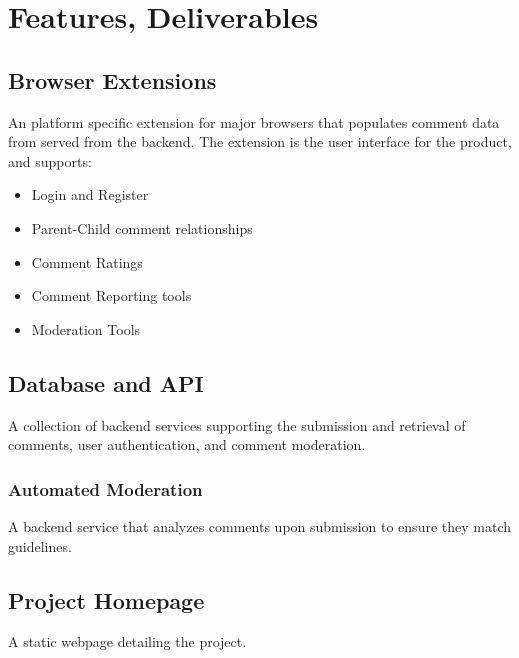 \documentclass[proposal.tex]{subfiles}
\begin{document}
    
\section{Features, Deliverables}

\subsection{Browser Extensions}

An platform specific extension for major browsers that populates comment data from served from the backend.
The extension is the user interface for the product, and supports:

\begin{itemize}
    \item Login and Register
    \item Parent-Child comment relationships
    \item Comment Ratings
    \item Comment Reporting tools
    \item Moderation Tools
\end{itemize}

\subsection{Database and API}

A collection of backend services supporting the submission and retrieval of comments, user authentication, and comment moderation.

\subsubsection{Automated Moderation}

A backend service that analyzes comments upon submission to ensure they match guidelines.

\subsection{Project Homepage}

A static webpage detailing the project.
\end{document}
